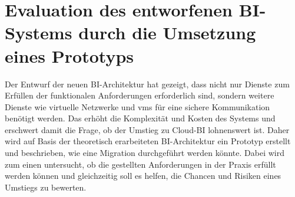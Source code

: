 \chapter{Evaluation des entworfenen BI-Systems durch die Umsetzung eines Prototyps} \label{ch:praktischeUmsetzung}
Der Entwurf der neuen BI-Architektur hat gezeigt, dass nicht nur Dienste zum Erfüllen der funktionalen Anforderungen erforderlich sind, sondern weitere Dienste wie virtuelle Netzwerke und \acp{vm} für eine sichere Kommunikation benötigt werden. Das erhöht die Komplexität und Kosten des Systems und erschwert damit die Frage, ob der Umstieg zu Cloud-BI lohnenswert ist. Daher wird auf Basis der theoretisch erarbeiteten BI-Architektur ein Prototyp erstellt und beschrieben, wie eine Migration durchgeführt werden könnte. Dabei wird zum einen untersucht, ob die gestellten Anforderungen in der Praxis erfüllt werden können und gleichzeitig soll es helfen, die Chancen und Risiken eines Umstiegs zu bewerten.




